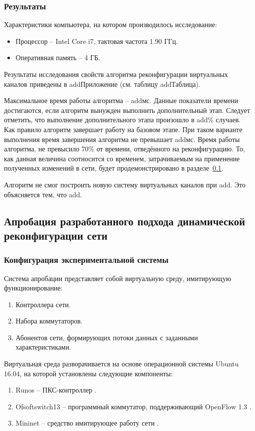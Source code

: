 \documentclass[12pt, a4paper]{article}
\begin{document}
\subsubsection{Результаты}
Характеристики компьютера, на котором производилось исследование:
\begin{itemize}
	\item Процессор -- Intel Core i7, тактовая частота 1.90 ГГц.
	\item Оперативная память -- 4 ГБ.
\end{itemize}

Результаты исследования свойств алгоритма реконфигурации виртуальных каналов приведены в addПриложение (см. таблицу addТаблица).

Максимальное время работы алгоритма – addмс. Данные показатели времени достигаются, если алгоритм вынужден выполнить дополнительный этап. Следует отметить, что выполнение дополнительного этапа произошло в add\% случаев. Как правило алгоритм завершает работу на базовом этапе. При таком варианте выполнения время завершения алгоритма не превышает addмс. Время работы алгоритма, не превысило 70\% от времени, отведённого на реконфигурацию. То, как данная величина соотносится со временем, затрачиваемым на применение полученных изменений в сети, будет продемонстрировано в разделе~\ref{subsec:approbation}.

Алгоритм не смог построить новую систему виртуальных каналов при add. Это объясняется тем, что add.

\subsection{Апробация разработанного подхода динамической реконфигурации сети} \label{subsec:approbation}
\subsubsection{Конфигурация экспериментальной системы}
Система апробации представляет собой виртуальную среду, имитирующую
функционирование:
\begin{enumerate}
	\item Контроллера сети.
	\item Набора коммутаторов.
	\item Абонентов сети, формирующих потоки данных с заданными характеристиками.
\end{enumerate}

Виртуальная среда разворачивается на основе операционной системы Ubuntu 16.04,
на которой установлены следующие компоненты:
\begin{enumerate}
	\item Runos -- ПКС-контроллер \cite{runos}.
	\item Ofsoftswitch13 -- программный коммутатор, поддерживающий OpenFlow 1.3 \cite{ofsoftswitch}.
	\item Mininet -- средство имитирующее работу сети \cite{mininet}.
\end{enumerate}
\end{document}
